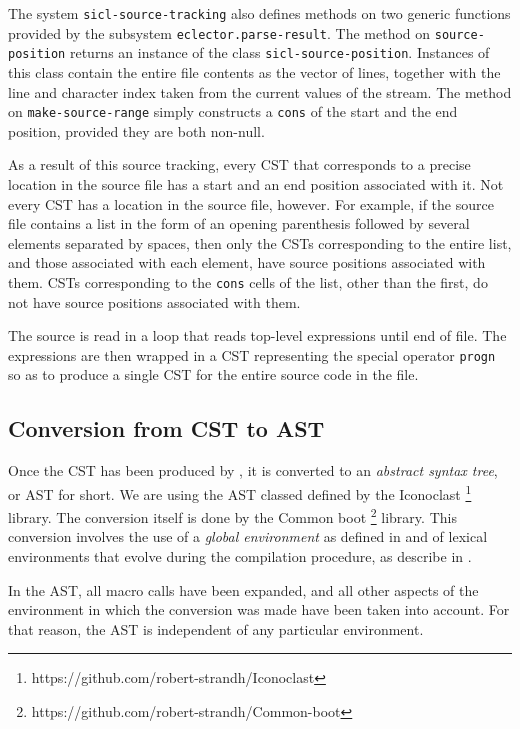 The system \texttt{sicl-source-tracking} also defines methods on two
generic functions provided by the \eclector{} subsystem
\texttt{eclector.parse-result}.  The method on
\texttt{source-position} returns an instance of the class
\texttt{sicl-source-position}.  Instances of this class contain the
entire file contents as the vector of lines, together with the line
and character index taken from the current values of the stream.  The
method on \texttt{make-source-range} simply constructs a \texttt{cons}
of the start and the end position, provided they are both non-null.

As a result of this source tracking, every CST that corresponds to a
precise location in the source file has a start and an end position
associated with it.  Not every CST has a location in the source file,
however.  For example, if the source file contains a list in the form
of an opening parenthesis followed by several elements separated by
spaces, then only the CSTs corresponding to the entire list, and those
associated with each element, have source positions associated with
them.  CSTs corresponding to the \texttt{cons} cells of the list,
other than the first, do not have source positions associated with
them.

The source is read in a loop that reads top-level expressions until
end of file.  The expressions are then wrapped in a CST representing
the special operator \texttt{progn} so as to produce a single CST for
the entire source code in the file.

\subsection{Conversion from CST to AST}

Once the CST has been produced by \eclector{}, it is converted to an
\emph{abstract syntax tree}, or AST for short.  We are using the AST
classed defined by the Iconoclast%
\footnote{https://github.com/robert-strandh/Iconoclast}
library.  The conversion itself is done by the Common boot%
\footnote{https://github.com/robert-strandh/Common-boot}
library.  This conversion involves the use of a \emph{global
  environment} as defined in
 and of lexical
environments that evolve during the compilation procedure, as describe
in .

In the AST, all macro calls have been expanded, and all other aspects
of the environment in which the conversion was made have been taken
into account.  For that reason, the AST is independent of any
particular environment.

